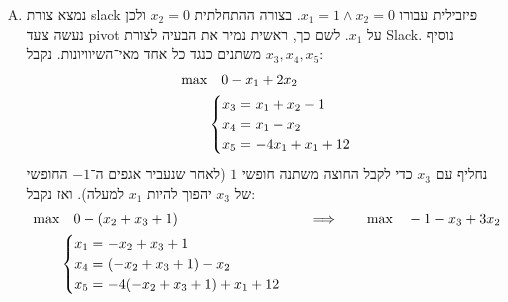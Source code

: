 \documentclass[]{../../../../tex/classes/homework}
\begin{document}
\begin{enumerate}[(A)]
\begin{center}
			\she
		\end{center}
		כאשר שטח הפיזביליות הוא השטח האפור. ניתן לראות מהסרטוט שצורת ה־slack ההתחלתית (המצויה בראשית הצירים, שכן מציבים $x_ 1 = x_2 = 0$) אינה בתחום הפיזביליות. 
		\begin{center}
			\begin{multicols}{3}
				התחום הכחול: $-x_1-x_2 \le -1$ \\
				התחום האדום: $-x_1 + x_2 \le 0$ \\
				התחום הירוק: $4x_1  - x_2 \le 12$
			\end{multicols}
		\end{center}
		\item נמצא צורת slack פיזבילית עבורו $x_1 = 1 \land x_2 = 0$. בצורה ההתחלתית $x_2 = 0$ ולכן נעשה צעד pivot על $x_1$. לשם כך, ראשית נמיר את הבעיה לצורת Slack. נוסיף $x_3, x_4, x_5$ משתנים כנגד כל אחד מאי־השיוויונות. נקבל: 
		\[ \begin{alignedat}{9}
			\max &\quad 0 -x_1 + 2x_2 \\ 
			&\begin{cases}
				x_3 = &\dequad \ x_1 + x_2 - 1 \\
				x_4 = &\dequad \ x_1 - x_2 \\
				x_5 = &\dequad \ -4x_1 + x_1 + 12
			\end{cases}
		\end{alignedat} \]
		נחליף עם $x_3$ כדי לקבל החוצה משתנה חופשי $1$ (לאחר שנעביר אגפים ה־$-1$ החופשי של $x_3$ יהפוך להיות $x_1$ למעלה). ואז נקבל: 
		\[ \begin{alignedat}{9}
			\max &\quad 0 - (x_2 + x_3 + 1) &\quad \quad \implies\quad \quad  && \max &\quad -1 - x_3 + 3x_2 \\ 
			&\begin{cases}
				x_1 = &\dequad \ - x_2 + x_3 + 1 \\
				x_4 = &\dequad \ (-x_2 + x_3 + 1) - x_2 \\
				x_5 = &\dequad \ -4(-x_2 + x_3 + 1) + x_1 + 12

\end{cases}
\end{alignedat}\]
\end{enumerate}
\end{document}
